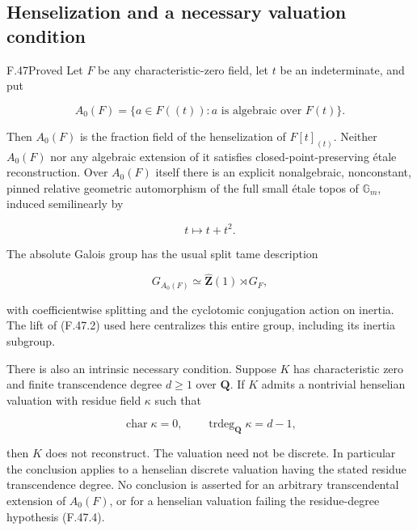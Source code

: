 \subsection{Henselization and a necessary valuation condition}

\begin{claim}{F.47}{Proved}
Let \(F\) be any characteristic-zero field, let \(t\) be an indeterminate, and put

\[
 A_0(F)=\{a\in F((t)):a\text{ is algebraic over }F(t)\}.
 \tag{F.47.1}
\]

Then \(A_0(F)\) is the fraction field of the henselization of \(F[t]_{(t)}\). Neither \(A_0(F)\) nor any algebraic extension of it satisfies closed-point-preserving étale reconstruction. Over \(A_0(F)\) itself there is an explicit nonalgebraic, nonconstant, pinned relative geometric automorphism of the full small étale topos of \(\mathbb G_m\), induced semilinearly by

\[
                         t\longmapsto t+t^2.
 \tag{F.47.2}
\]

The absolute Galois group has the usual split tame description

\[
 G_{A_0(F)}\simeq\widehat{\mathbf Z}(1)\rtimes G_F,
 \tag{F.47.3}
\]

with coefficientwise splitting and the cyclotomic conjugation action on inertia. The lift of (F.47.2) used here centralizes this entire group, including its inertia subgroup.

There is also an intrinsic necessary condition. Suppose \(K\) has characteristic zero and finite transcendence degree \(d\geq1\) over \(\mathbf Q\). If \(K\) admits a nontrivial henselian valuation with residue field \(\kappa\) such that

\[
 \operatorname{char}\kappa=0,
 \qquad \operatorname{trdeg}_{\mathbf Q}\kappa=d-1,
 \tag{F.47.4}
\]

then \(K\) does not reconstruct. The valuation need not be discrete. In particular the conclusion applies to a henselian discrete valuation having the stated residue transcendence degree. No conclusion is asserted for an arbitrary transcendental extension of \(A_0(F)\), or for a henselian valuation failing the residue-degree hypothesis (F.47.4).
\end{claim}
